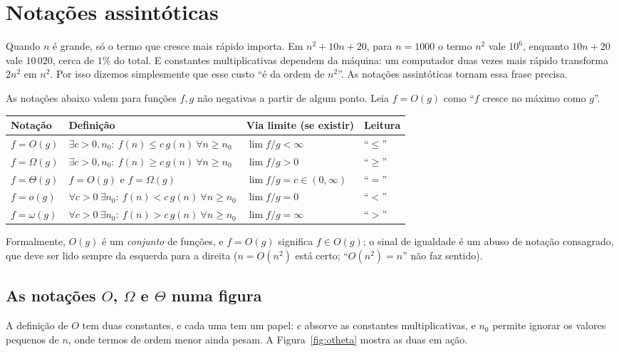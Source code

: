 \section{Notações assintóticas}\label{sec:notacoes}
\begin{intuicao}
Quando $n$ é grande, só o termo que cresce mais rápido importa. Em $n^2+10n+20$, para $n=1000$ o termo $n^2$ vale $10^6$, enquanto $10n+20$ vale $10\,020$, cerca de $1\%$ do total. E constantes multiplicativas dependem da máquina: um computador duas vezes mais rápido transforma $2n^2$ em $n^2$. Por isso dizemos simplesmente que esse custo ``é da ordem de $n^2$''. As notações assintóticas tornam essa frase precisa.
\end{intuicao}

As notações abaixo valem para funções $f,g$ não negativas a partir de algum ponto. Leia $f=O(g)$ como ``$f$ cresce no máximo como $g$''.
\begin{center}
\begin{tabular}{@{}llll@{}}
\toprule
Notação & Definição & Via limite (se existir) & Leitura\\
\midrule
$f=O(g)$ & $\exists c>0,n_0:\ f(n)\le c\,g(n)\ \forall n\ge n_0$ & $\lim f/g<\infty$ & ``$\le$''\\
$f=\Omega(g)$ & $\exists c>0,n_0:\ f(n)\ge c\,g(n)\ \forall n\ge n_0$ & $\lim f/g>0$ & ``$\ge$''\\
$f=\Theta(g)$ & $f=O(g)$ e $f=\Omega(g)$ & $\lim f/g=c\in(0,\infty)$ & ``$=$''\\
$f=o(g)$ & $\forall c>0\ \exists n_0:\ f(n)<c\,g(n)\ \forall n\ge n_0$ & $\lim f/g=0$ & ``$<$''\\
$f=\omega(g)$ & $\forall c>0\ \exists n_0:\ f(n)>c\,g(n)\ \forall n\ge n_0$ & $\lim f/g=\infty$ & ``$>$''\\
\bottomrule
\end{tabular}
\end{center}
Formalmente, $O(g)$ é um \emph{conjunto} de funções, e $f=O(g)$ significa $f\in O(g)$; o sinal de igualdade é um abuso de notação consagrado, que deve ser lido sempre da esquerda para a direita ($n=O(n^2)$ está certo; ``$O(n^2)=n$'' não faz sentido).

\subsection*{As notações $O$, $\Omega$ e $\Theta$ numa figura}
A definição de $O$ tem duas constantes, e cada uma tem um papel: $c$ absorve as constantes multiplicativas, e $n_0$ permite ignorar os valores pequenos de $n$, onde termos de ordem menor ainda pesam. A Figura~\ref{fig:otheta} mostra as duas em ação.


